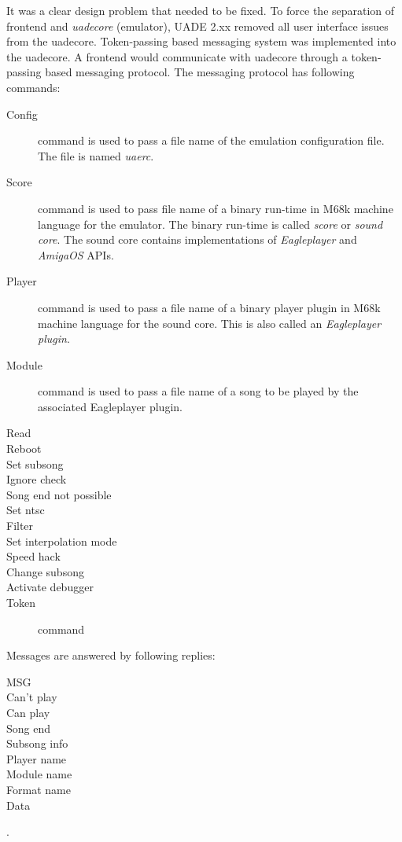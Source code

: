 \documentclass{article}
\begin{document}
It was a clear design problem that needed to be fixed. To force the separation
of frontend and \emph{uadecore} (emulator), UADE 2.xx removed all user
interface issues from the uadecore. Token-passing based messaging system was
implemented into the uadecore. A frontend would communicate with uadecore
through a token-passing based messaging protocol. The messaging protocol
has following commands:
\begin{description}
\item [Config] command is used to pass a file name of the emulation
configuration file. The file is named \emph{uaerc}.
\item [Score] command is used to pass file name of a binary run-time in M68k
machine language for the emulator. The binary run-time is called
\emph{score} or \emph{sound core}. The sound core contains implementations of
\emph{Eagleplayer} and \emph{AmigaOS} APIs.
\item [Player] command is used to pass a file name of a binary player plugin
in M68k machine language for the sound core. This is also called an
\emph{Eagleplayer plugin}.
\item [Module] command is used to pass a file name of a song to be played by
the associated Eagleplayer plugin.
\item [Read]
\item [Reboot]
\item [Set subsong]
\item [Ignore check]
\item [Song end not possible]
\item [Set ntsc]
\item [Filter]
\item [Set interpolation mode]
\item [Speed hack]
\item [Change subsong]
\item [Activate debugger]
\item [Token] command
\end{description}
Messages are answered by following replies:
\begin{description}
\item [MSG]
\item [Can't play]
\item [Can play]
\item [Song end]
\item [Subsong info]
\item [Player name]
\item [Module name]
\item [Format name]
\item [Data]
\end{description}.
\end{document}
